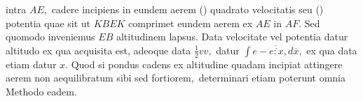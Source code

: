intra $AE,$ cadere incipiens\protect{}
in eundem aerem\protect{}
(\phantom)\hspace*{-1.2mm}%
quadrato velocitatis\protect{} seu%
\phantom(\hspace*{-1.2mm})
potentia\protect{} quae sit ut $KBEK$
comprimet eundem aerem\protect{} ex $AE$ in $AF.$
Sed quomodo inveniemus $EB$ altitudinem lapsus.\protect{}
Data velocitate\protect{}
vel potentia\protect{} datur
altitudo\protect{} ex qua acquisita est,
adeoque data $\displaystyle\frac{1}{2}vv,$
datur $\displaystyle \!\int\! \overline{e - \overline{e : x}, d\overline{x}},$
ex qua data etiam datur $x.$%
Quod si pondus cadens\protect{}
ex altitudine\protect{} quadam
incipiat attingere aerem\protect{}
non aequilibratum sibi sed fortiorem\lbrack,\rbrack\
determinari etiam poterunt omnia Methodo\protect{} eadem.%
\pend%
\normalsize
\count{}
\count{}
\count{}%
%
%
